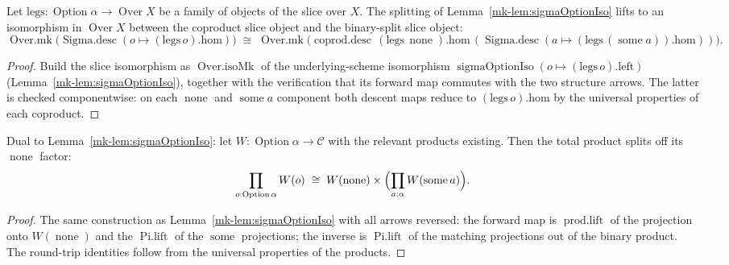 \begin{lemma}\label{mk-lem:over_sigmaOptionIso}
  \leanok

  Let \(\mathrm{legs} : \operatorname{Option}\alpha \to \operatorname{Over} X\) be a family of objects
  of the slice over \(X\). The splitting of Lemma~\ref{mk-lem:sigmaOptionIso} lifts to an isomorphism in
  \(\operatorname{Over} X\) between the coproduct slice object and the binary-split slice object:
  \[
    \operatorname{Over.mk}\bigl(\operatorname{Sigma.desc}(o \mapsto (\mathrm{legs}\,o).\mathrm{hom})\bigr)
      \;\cong\;
    \operatorname{Over.mk}\bigl(\operatorname{coprod.desc}\,(\mathrm{legs}\,\operatorname{none}).\mathrm{hom}\,
      (\operatorname{Sigma.desc}(a \mapsto (\mathrm{legs}\,(\operatorname{some} a)).\mathrm{hom}))\bigr).
  \]
\end{lemma}
\begin{proof}
  Build the slice isomorphism as \(\operatorname{Over.isoMk}\) of the underlying-scheme isomorphism
  \(\operatorname{sigmaOptionIso}(o \mapsto (\mathrm{legs}\,o).\mathrm{left})\)
  (Lemma~\ref{mk-lem:sigmaOptionIso}), together with the verification that its forward map commutes with
  the two structure arrows. The latter is checked componentwise: on each \(\operatorname{none}\) and
  \(\operatorname{some} a\) component both descent maps reduce to \((\mathrm{legs}\,o).\mathrm{hom}\) by
  the universal properties of each coproduct.
\end{proof}

\begin{lemma}\label{mk-lem:piOptionIso}
  \leanok

  Dual to Lemma~\ref{mk-lem:sigmaOptionIso}: let \(W : \operatorname{Option}\alpha \to \mathcal{C}\) with
  the relevant products existing. Then the total product splits off its \(\operatorname{none}\) factor:
  \[
    \prod_{o : \operatorname{Option}\alpha} W(o) \;\cong\; W(\operatorname{none}) \times
      \Bigl(\prod_{a : \alpha} W(\operatorname{some} a)\Bigr).
  \]
\end{lemma}
\begin{proof}

  The same construction as Lemma~\ref{mk-lem:sigmaOptionIso} with all arrows reversed: the forward map is
  \(\operatorname{prod.lift}\) of the projection onto \(W(\operatorname{none})\) and the
  \(\operatorname{Pi.lift}\) of the \(\operatorname{some}\) projections; the inverse is
  \(\operatorname{Pi.lift}\) of the matching projections out of the binary product. The round-trip
  identities follow from the universal properties of the products.
\end{proof}

